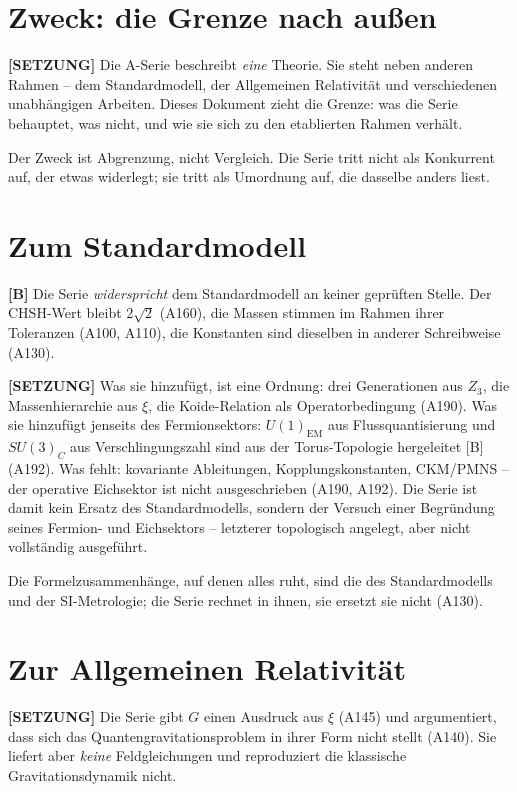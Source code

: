 \section{Zweck: die Grenze nach außen}

\textbf{[SETZUNG]} Die A-Serie beschreibt \emph{eine} Theorie. Sie steht neben
anderen Rahmen -- dem Standardmodell, der Allgemeinen Relativität und
verschiedenen unabhängigen Arbeiten. Dieses Dokument zieht die Grenze: was die
Serie behauptet, was nicht, und wie sie sich zu den etablierten Rahmen verhält.

Der Zweck ist Abgrenzung, nicht Vergleich. Die Serie tritt nicht als Konkurrent
auf, der etwas widerlegt; sie tritt als Umordnung auf, die dasselbe anders liest.

\section{Zum Standardmodell}

\textbf{[B]} Die Serie \emph{widerspricht} dem Standardmodell an keiner
geprüften Stelle. Der CHSH-Wert bleibt $2\sqrt2$ (A160), die Massen stimmen im
Rahmen ihrer Toleranzen (A100, A110), die Konstanten sind dieselben in anderer
Schreibweise (A130).

\textbf{[SETZUNG]} Was sie hinzufügt, ist eine Ordnung: drei Generationen aus
$Z_3$, die Massenhierarchie aus $\xi$, die Koide-Relation als Operatorbedingung
(A190). Was sie hinzufügt jenseits des Fermionsektors: $U(1)_\text{EM}$ aus
Flussquantisierung und $SU(3)_C$ aus Verschlingungszahl sind aus der Torus-Topologie
hergeleitet [B] (A192). Was fehlt: kovariante Ableitungen, Kopplungskonstanten,
CKM/PMNS -- der operative Eichsektor ist nicht ausgeschrieben (A190, A192).
Die Serie ist damit kein Ersatz des Standardmodells, sondern der Versuch
einer Begründung seines Fermion- und Eichsektors -- letzterer topologisch
angelegt, aber nicht vollständig ausgeführt.

Die Formelzusammenhänge, auf denen alles ruht, sind die des Standardmodells und
der SI-Metrologie; die Serie rechnet in ihnen, sie ersetzt sie nicht (A130).

\section{Zur Allgemeinen Relativität}

\textbf{[SETZUNG]} Die Serie gibt $G$ einen Ausdruck aus $\xi$ (A145) und
argumentiert, dass sich das Quantengravitationsproblem in ihrer Form nicht
stellt (A140). Sie liefert aber \emph{keine} Feldgleichungen und reproduziert
die klassische Gravitationsdynamik nicht.

